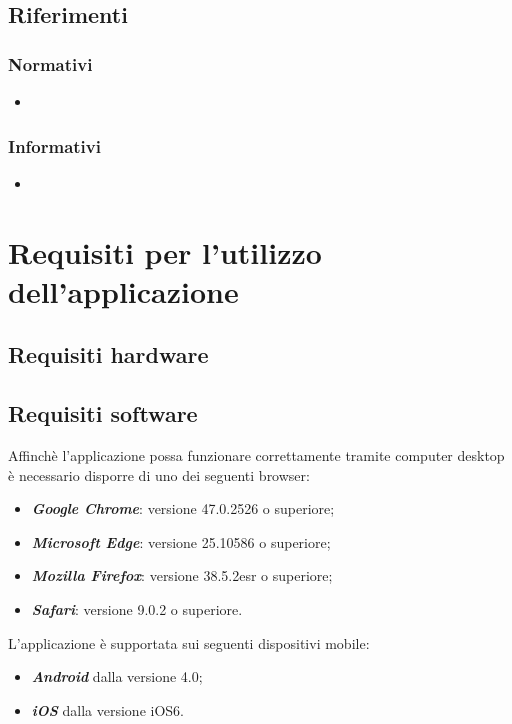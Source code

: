 \documentclass[12pt,a4paper]{article}
\begin{document}
	\subsection{Riferimenti}
	
	\subsubsection{Normativi}
	\begin{itemize}
		\item
		
	\end{itemize}
	
	\subsubsection{Informativi}
	\begin{itemize}
		\item 
	\end{itemize}
	
	\newpage
	\section{Requisiti per l'utilizzo dell'applicazione} 
	\subsection{Requisiti hardware}
	
	\subsection{Requisiti software}
	
	Affinchè l’applicazione possa funzionare correttamente tramite computer desktop è
	necessario disporre di uno dei seguenti browser:
	\begin{itemize}
		\item \textit{\textbf{Google Chrome}}: versione  47.0.2526 o superiore;
		\item \textit{\textbf{Microsoft Edge}}: versione 25.10586 o superiore;
	\item \textit{\textbf{Mozilla Firefox}}: versione 38.5.2esr o superiore;
	\item\textit{	\textbf{Safari}}: versione 9.0.2 o superiore.
	\end{itemize}
 L'applicazione è supportata sui seguenti dispositivi mobile:
	\begin{itemize}
	\item \textit{\textbf{Android}} dalla versione 4.0;
	\item \textit{\textbf{iOS}} dalla versione iOS6.
\end{itemize}
\end{document}
